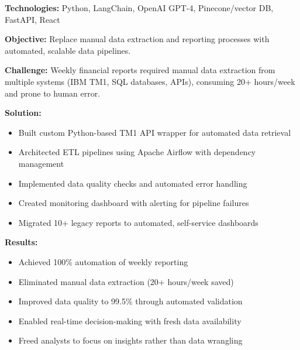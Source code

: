 \documentclass[11pt, a4paper]{awesome-cv}
\begin{document}
\begin{cvparagraph}
\textbf{Technologies:} Python, LangChain, OpenAI GPT-4, Pinecone/vector DB, FastAPI, React
\end{cvparagraph}

\vspace{1em}


\begin{cvparagraph}
\textbf{Objective:} Replace manual data extraction and reporting processes with automated, scalable data pipelines.
\end{cvparagraph}

\begin{cvparagraph}
\textbf{Challenge:} Weekly financial reports required manual data extraction from multiple systems (IBM TM1, SQL databases, APIs), consuming 20+ hours/week and prone to human error.
\end{cvparagraph}

\begin{cvparagraph}
\textbf{Solution:}
\begin{itemize}
    \item Built custom Python-based TM1 API wrapper for automated data retrieval
    \item Architected ETL pipelines using Apache Airflow with dependency management
    \item Implemented data quality checks and automated error handling
    \item Created monitoring dashboard with alerting for pipeline failures
    \item Migrated 10+ legacy reports to automated, self-service dashboards
\end{itemize}
\end{cvparagraph}

\begin{cvparagraph}
\textbf{Results:}
\begin{itemize}
    \item Achieved 100\% automation of weekly reporting
    \item Eliminated manual data extraction (20+ hours/week saved)
    \item Improved data quality to 99.5\% through automated validation
    \item Enabled real-time decision-making with fresh data availability
    \item Freed analysts to focus on insights rather than data wrangling
\end{itemize}
\end{cvparagraph}
\end{document}

